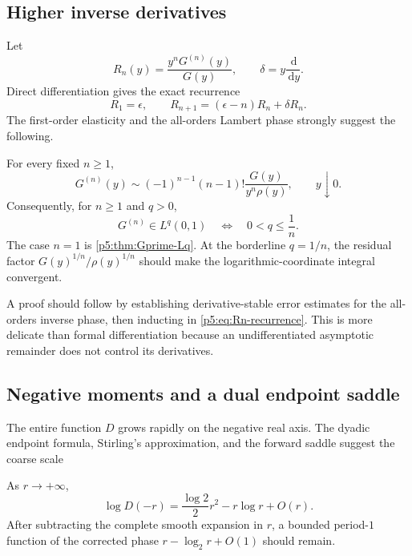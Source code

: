 \documentclass[11pt,oneside]{article}
\theoremstyle{definition}
\theoremstyle{remark}
\newcommand{\dd}{\,\mathrm d}
\newcommand{\1}{\mathbf 1}
\begin{document}
\subsection{Higher inverse derivatives}

Let
\begin{equation}
 R_n(y)=\frac{y^nG^{(n)}(y)}{G(y)},
 \qquad \delta=y\frac{\dd}{\dd y}.
\end{equation}
Direct differentiation gives the exact recurrence
\begin{equation}\label{p5:eq:Rn-recurrence}
 R_1=\epsilon,
 \qquad
 R_{n+1}=(\epsilon-n)R_n+\delta R_n.
\end{equation}
The first-order elasticity and the all-orders Lambert phase strongly suggest the following.

\begin{conjecture}\label{p5:conj:inverse-derivatives}
For every fixed $n\ge1$,
\begin{equation}\label{p5:eq:inverse-derivative-conjecture}
 G^{(n)}(y)\sim(-1)^{n-1}(n-1)!
 \frac{G(y)}{y^n\rho(y)},
 \qquad y\downarrow0.
\end{equation}
Consequently, for $n\ge1$ and $q>0$,
\begin{equation}\label{p5:eq:higher-inverse-Lq-conjecture}
 G^{(n)}\in L^q(0,1)
 \quad\Longleftrightarrow\quad 0<q\le\frac1n.
\end{equation}
The case $n=1$ is \cref{p5:thm:Gprime-Lq}.  At the borderline $q=1/n$, the residual factor $G(y)^{1/n}/\rho(y)^{1/n}$ should make the logarithmic-coordinate integral convergent.
\end{conjecture}

A proof should follow by establishing derivative-stable error estimates for the all-orders inverse phase, then inducting in \eqref{p5:eq:Rn-recurrence}.  This is more delicate than formal differentiation because an undifferentiated asymptotic remainder does not control its derivatives.

\subsection{Negative moments and a dual endpoint saddle}

The entire function $D$ grows rapidly on the negative real axis.  The dyadic endpoint formula, Stirling's approximation, and the forward saddle suggest the coarse scale
\begin{conjecture}\label{p5:conj:negative-moments}
As $r\to+\infty$,
\begin{equation}\label{p5:eq:negative-moment-conjecture}
 \log D(-r)=\frac{\log2}{2}r^2-r\log r+O(r).
\end{equation}
After subtracting the complete smooth expansion in $r$, a bounded period-$1$ function of the corrected phase
$r-\log_2r+O(1)$ should remain.
\end{conjecture}
\end{document}
